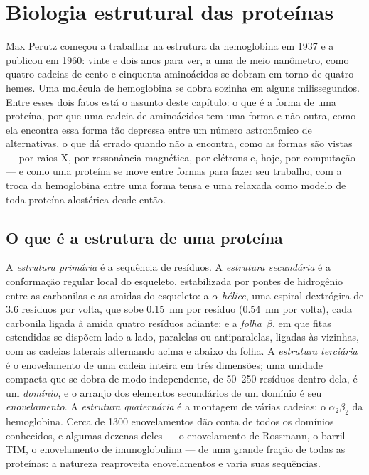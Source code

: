 \chapter{Biologia estrutural das proteínas}\label{ch:b3:structural-biology}

Max Perutz começou a trabalhar na estrutura da hemoglobina em 1937 e a
publicou em 1960: vinte e dois anos para ver, a uma  de meio
nanômetro, como quatro cadeias de cento e cinquenta aminoácidos se
dobram em torno de quatro hemes. Uma molécula de hemoglobina se dobra
sozinha em alguns milissegundos. Entre esses dois fatos está o assunto
deste capítulo: o que é a forma de uma proteína, por que uma cadeia de
aminoácidos tem uma forma e não outra, como ela encontra essa forma tão
depressa entre um número astronômico de alternativas, o que dá errado
quando não a encontra, como as formas são vistas --- por raios X, por
ressonância magnética, por elétrons e, hoje, por computação --- e como
uma proteína se move entre formas para fazer seu trabalho, com a troca
da hemoglobina entre uma forma tensa e uma relaxada como modelo de toda
proteína alostérica desde então.

\section{O que é a estrutura de uma proteína}

\begin{definition}\label{def:b3:structural-biology:levels}
A \emph{estrutura primária} é a sequência de resíduos. A
\emph{estrutura secundária} é a conformação regular local do esqueleto,
estabilizada por pontes de hidrogênio entre as carbonilas e as amidas
do esqueleto: a \emph{$\alpha$-hélice}, uma espiral dextrógira de $3.6$
resíduos por volta, que sobe \qty{0.15}{nm} por resíduo
(\qty{0.54}{nm} por volta), cada carbonila ligada à amida quatro
resíduos adiante; e a \emph{folha~$\beta$}, em que fitas estendidas se
dispõem lado a lado, paralelas ou antiparalelas, ligadas às vizinhas,
com as cadeias laterais alternando acima e abaixo da folha. A
\emph{estrutura terciária} é o enovelamento de uma cadeia inteira em
três dimensões; uma unidade compacta que se dobra de modo independente,
de \numrange{50}{250} resíduos dentro dela, é um \emph{domínio}, e o
arranjo dos elementos secundários de um domínio é seu
\emph{enovelamento}. A \emph{estrutura quaternária} é a montagem de
várias cadeias: o $\alpha_{2}\beta_{2}$ da hemoglobina. Cerca de
\num{1300} enovelamentos dão conta de todos os domínios conhecidos, e
algumas dezenas deles --- o enovelamento de Rossmann, o barril TIM, o
enovelamento de imunoglobulina --- de uma grande fração de todas as
proteínas: a natureza reaproveita enovelamentos e varia suas
sequências.
\end{definition}

